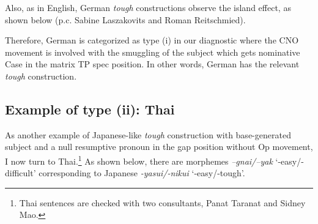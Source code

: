 \documentclass[output=paper,colorlinks,citecolor=brown,
]{langscibook}
\begin{document}
\begin{exe}


\end{exe}

Also, as in English, German \textit{tough} constructions observe the island effect, as shown below (p.c. Sabine Laszakovits and Roman Reitschmied). 

\begin{exe}
\ex \label{25ha}
\begin{xlist}



\end{xlist}
\end{exe}

Therefore, German is categorized as type (i) in our diagnostic where the CNO movement is involved with the smuggling of the subject which gets nominative Case in the matrix TP spec position. In other words, German has the relevant \textit{tough} construction.

\subsection{Example of type (ii): Thai} \label{s3.3ha}
As another example of Japanese-like \textit{tough} construction with base-generated subject and a null resumptive pronoun in the gap position without Op movement, I now turn to Thai.\footnote{Thai sentences are checked with two consultants, Panat Taranat and Sidney Mao.} As shown below, there are morphemes \textit{–gnai/–yak} ‘-easy/-difficult’ corresponding to Japanese \textit{-yasui/-nikui} ‘-easy/-tough’. 
\end{document}
